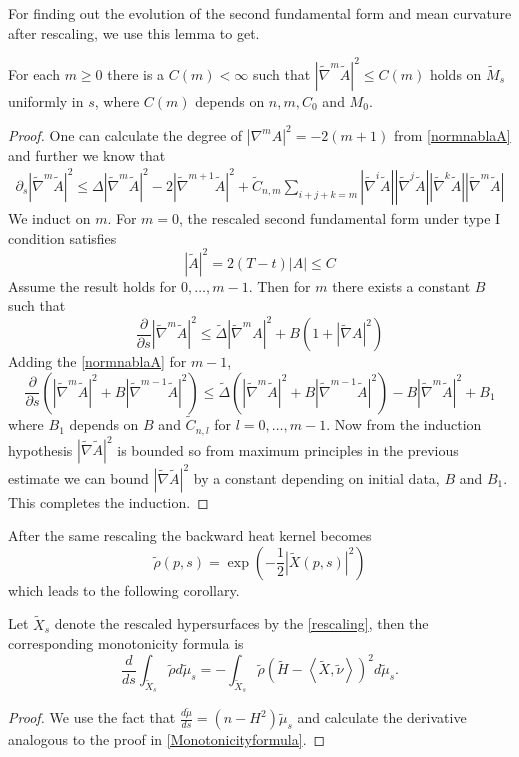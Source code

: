 For finding out the evolution of the second fundamental form and mean curvature after rescaling, we use this lemma to get.
\begin{proposition}
    For each $ m \ge 0 $ there is a $ C(m) < \infty $ such that $ |\tilde{\nabla}^{m} \tilde{A}|^{2} \le C(m)$ holds on $ \tilde{M}_{s} $ uniformly in $ s $, where $ C(m) $ depends on $ n,m,C_{0} $ and $ M_{0} $. 
\end{proposition}
\begin{proof}
   One can calculate the degree of $ |\nabla^{m} A|^{2}  = -2(m+1)$ from \cref{normnablaA} and further we know that 
   \begin{align*}
    \partial_{s}|\tilde{\nabla}^{m}\tilde{A}|^{2} \le \Delta|\tilde{\nabla}^{m}\tilde{A}|^{2} - 2|\tilde{\nabla}^{m+1}\tilde{A}|^{2} + \tilde{C}_{n,m}\sum_{i+j+k=m}^{}|\tilde{\nabla}^{i}\tilde{A}|  |\tilde{\nabla}^{j}\tilde{A}|| \tilde{\nabla}^{k}\tilde{A}|| \tilde{\nabla}^{m}\tilde{A}|
\end{align*}
   We induct on $ m $. For $ m = 0 $, the rescaled second fundamental form under type I condition satisfies 
   \[ |\tilde{A}|^{2} = 2(T-t)|A| \le C \]
   Assume the result holds for $ 0,\dots, m-1 $. Then for $ m $ there exists a constant $ B $ such that 
   \[ \frac{\partial}{\partial s}| \tilde{\nabla}^{m} \tilde{A}|^{2}  \le \tilde{\Delta}| \tilde{ \nabla}^{m}A|^{2} + B (1+|\tilde{\nabla}A|^{2})\]
   Adding the \cref{normnablaA} for $ m-1 $, 
   \[ \frac{\partial}{\partial s}(|\tilde{\nabla}^{m} \tilde{A}|^{2}+ B| \tilde{\nabla}^{m-1} \tilde{A}|^{2}) \le \tilde{\Delta}(|\tilde{\nabla}^{m} \tilde{A}|^{2}+ B| \tilde{\nabla}^{m-1} \tilde{A}|^{2})  - B|\tilde{\nabla}^{m}\tilde{A}|^{2}+ B_{1}\]
   where $ B_{1} $ depends on $ B $ and $ \tilde{C}_{n,l} $ for $ l = 0, \dots, m-1 $. Now from the induction hypothesis $ |\tilde{\nabla}\tilde{A}|^{2} $ is bounded so from maximum principles in the previous estimate we can bound $ |\tilde{\nabla} \tilde{A}|^{2} $ by a constant depending on initial data, $ B $ and $ B_{1} $. This completes the induction.
\end{proof}

After the same rescaling the backward heat kernel becomes
\[ \tilde{\rho}(p,s) = \exp \left( - \frac{1}{2}| \tilde{X}(p,s)|^{2} \right) \]
which leads to the following corollary.
\begin{corollary}
    Let $ \tilde{X}_{s} $ denote the rescaled hypersurfaces by the \cref{rescaling}, then the corresponding monotonicity formula is 
    \[ \frac{d}{d s} \int_{\tilde{X}_{s}} \tilde{\rho} d \tilde{\mu}_{s}=  - \int_{\tilde{X}_{s}} \tilde{\rho} \left(\tilde{H}- \left< \tilde{X}, \tilde{\nu} \right> \right)^{2}d \tilde{\mu}_{s}.\]
\end{corollary}
\begin{proof}
    We use the fact that $ \frac{d \tilde{\mu}}{ds} = (n-H^{2}) \tilde{\mu}_{s} $ and calculate the derivative analogous to the proof in \cref{Monotonicityformula}.
\end{proof}

